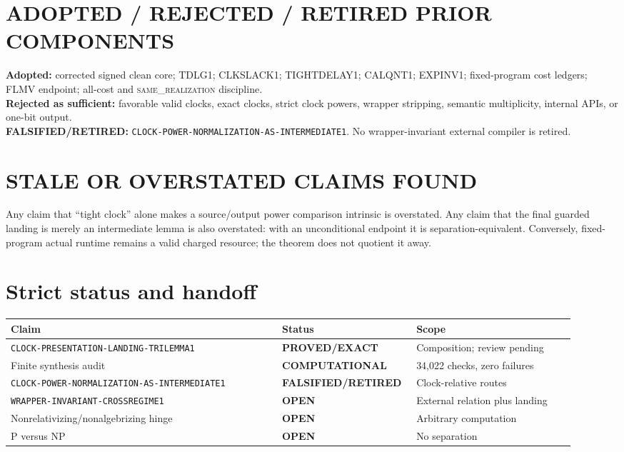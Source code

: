 \documentclass[11pt]{article}
\newcommand{\EXACT}{\textbf{PROVED/EXACT}}
\newcommand{\COMP}{\textbf{COMPUTATIONAL}}
\newcommand{\OPEN}{\textbf{OPEN}}
\newcommand{\RETIRED}{\textbf{FALSIFIED/RETIRED}}
\newcommand{\same}{\textsc{same\_realization}}
\begin{document}
\section{ADOPTED / REJECTED / RETIRED PRIOR COMPONENTS}

\textbf{Adopted:} corrected signed clean core; TDLG1; CLKSLACK1;
TIGHTDELAY1; CALQNT1; EXPINV1; fixed-program cost ledgers; FLMV endpoint;
all-cost and \same{} discipline.\\
\textbf{Rejected as sufficient:} favorable valid clocks, exact clocks,
strict clock powers, wrapper stripping, semantic multiplicity, internal APIs,
or one-bit output.\\
\textbf{FALSIFIED/RETIRED:}
\texttt{CLOCK-POWER-NORMALIZATION-AS-INTERMEDIATE1}.  No wrapper-invariant
external compiler is retired.

\section{STALE OR OVERSTATED CLAIMS FOUND}

Any claim that ``tight clock'' alone makes a source/output power comparison
intrinsic is overstated.  Any claim that the final guarded landing is merely
an intermediate lemma is also overstated: with an unconditional endpoint it
is separation-equivalent.  Conversely, fixed-program actual runtime remains
a valid charged resource; the theorem does not quotient it away.

\section{Strict status and handoff}

\begin{center}\small
\begin{tabular}{p{0.46\linewidth}p{0.19\linewidth}p{0.27\linewidth}}
\toprule Claim & Status & Scope\\ \midrule
\texttt{CLOCK-PRESENTATION-LANDING-TRILEMMA1} & \EXACT & Composition; review pending\\
Finite synthesis audit & \COMP & 34,022 checks, zero failures\\
\texttt{CLOCK-POWER-NORMALIZATION-AS-INTERMEDIATE1} & \RETIRED & Clock-relative routes\\
\texttt{WRAPPER-INVARIANT-CROSSREGIME1} & \OPEN & External relation plus landing\\
Nonrelativizing/nonalgebrizing hinge & \OPEN & Arbitrary computation\\
P versus NP & \OPEN & No separation\\ \bottomrule
\end{tabular}
\end{center}
\end{document}
